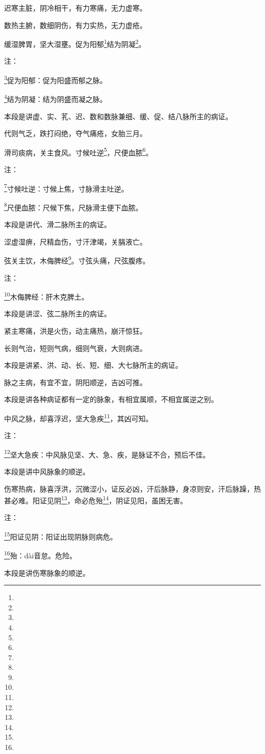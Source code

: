 \documentclass[a4paper,12pt,UTF8,twoside]{ctexbook}
\begin{document}
迟寒主脏，阴冷相干，有力寒痛，无力虚寒。

数热主腑，数细阴伤，有力实热，无力虚疮。

缓湿脾胃，坚大湿壅。促为阳郁\footnote{}结为阴凝\footnote{}。

注：

\footnote{}促为阳郁：促为阳盛而郁之脉。

\footnote{}结为阴凝：结为阴盛而凝之脉。

本段是讲虚、实、芤、迟、数和数脉兼细、缓、促、结八脉所主的病证。

代则气乏，跌打闷绝，夺气痛疮，女胎三月。

滑司痰病，关主食风。寸候吐逆\footnote{}，尺便血脓\footnote{}。

注：

\footnote{}寸候吐逆：寸候上焦，寸脉滑主吐逆。

\footnote{}尺便血脓：尺候下焦，尺脉滑主便下血脓。

本段是讲代、滑二脉所主的病证。

涩虚湿痹，尺精血伤，寸汗津竭，关膈液亡。

弦关主饮，木侮脾经\footnote{}。寸弦头痛，尺弦腹疼。

注：

\footnote{}木侮脾经：肝木克脾土。

本段是讲涩、弦二脉所主的病证。

紧主寒痛，洪是火伤，动主痛热，崩汗惊狂。

长则气治，短则气病，细则气衰，大则病进。

本段是讲紧、洪、动、长、短、细、大七脉所主的病证。

脉之主病，有宜不宜，阴阳顺逆，吉凶可推。

本段是讲各种病证都有一定的脉象，有相宜属顺，不相宜属逆之别。

中风之脉，却喜浮迟，坚大急疾\footnote{}，其凶可知。

注：

\footnote{}坚大急疾：中风脉见坚、大、急、疾，是脉证不合，预后不佳。

本段是讲中风脉象的顺逆。

伤寒热病，脉喜浮洪，沉微涩小，证反必凶，汗后脉静，身凉则安，汗后脉躁，热甚必难。阳证见阴\footnote{}，命必危殆\footnote{}，阴证见阳，虽困无害。

注：

\footnote{}阳证见阴：阳证出现阴脉则病危。

\footnote{}殆：dài音怠。危险。

本段是讲伤寒脉象的顺逆。
\end{document}
